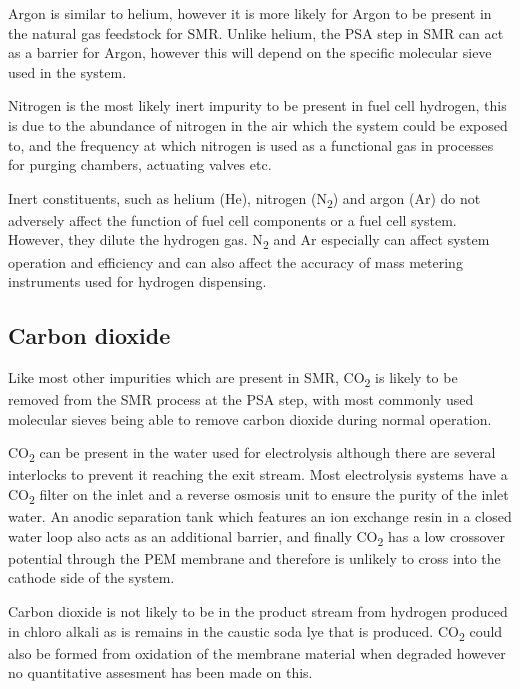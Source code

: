 Argon is similar to helium, however it is more likely for Argon to be present in the natural gas feedstock for SMR. Unlike helium, the PSA step in SMR can act as a barrier for Argon, however this will depend on the specific molecular sieve used in the system. \cite{Bacquart2018}

Nitrogen is the most likely inert impurity to be present in fuel cell hydrogen, this is due to the abundance of nitrogen in the air which the system could be exposed to, and the frequency at which nitrogen is used as a functional gas in processes for purging chambers, actuating valves etc.

Inert constituents, such as helium (He), nitrogen (N\textsubscript{2}) and argon (Ar) do not adversely affect the function of fuel cell components or a fuel cell system. However, they dilute the hydrogen gas. N\textsubscript{2} and Ar especially can affect system operation and efficiency and can also affect the accuracy of mass metering instruments used for hydrogen dispensing. \cite{InternationalStandardISO14687-2:20122012}

\subsection*{Carbon dioxide} 
Like most other impurities which are present in SMR, CO\textsubscript{2} is likely to be removed from the SMR process at the PSA step, with most commonly used molecular sieves being able to remove carbon dioxide during normal operation. \cite{Muradov2015} 

CO\textsubscript{2} can be present in the water used for electrolysis although there are several interlocks to prevent it reaching the exit stream. Most electrolysis systems have a CO\textsubscript{2} filter on the inlet and a reverse osmosis unit to ensure the purity of the inlet water. An anodic separation tank which features an ion exchange resin in a closed water loop also acts as an additional barrier, and finally CO\textsubscript{2} has a low crossover potential through the PEM membrane and therefore is unlikely to cross into the cathode side of the system.\cite{Bacquart2018}

Carbon dioxide is not likely to be in the product stream from hydrogen produced in chloro alkali as is remains in the caustic soda lye that is produced. CO\textsubscript{2} could also be formed from oxidation of the membrane material when degraded however no quantitative assesment has been made on this. \cite{Bacquart2018}

